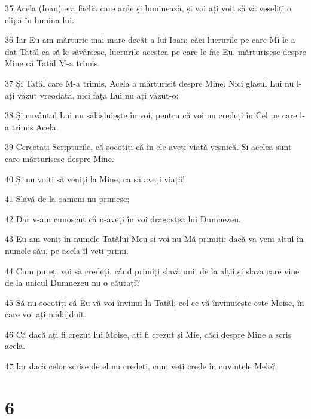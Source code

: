 \par 35 Acela (Ioan) era făclia care arde și luminează, și voi ați voit să vă veseliți o clipă în lumina lui.
\par 36 Iar Eu am mărturie mai mare decât a lui Ioan; căci lucrurile pe care Mi le-a dat Tatăl ca să le săvârșesc, lucrurile acestea pe care le fac Eu, mărturisesc despre Mine că Tatăl M-a trimis.
\par 37 Și Tatăl care M-a trimis, Acela a mărturisit despre Mine. Nici glasul Lui nu l-ați văzut vreodată, nici fața Lui nu ați văzut-o;
\par 38 Și cuvântul Lui nu sălășluiește în voi, pentru că voi nu credeți în Cel pe care l-a trimis Acela.
\par 39 Cercetați Scripturile, că socotiți că în ele aveți viață veșnică. Și acelea sunt care mărturisesc despre Mine.
\par 40 Și nu voiți să veniți la Mine, ca să aveți viață!
\par 41 Slavă de la oameni nu primesc;
\par 42 Dar v-am cunoscut că n-aveți în voi dragostea lui Dumnezeu.
\par 43 Eu am venit în numele Tatălui Meu și voi nu Mă primiți; dacă va veni altul în numele său, pe acela îl veți primi.
\par 44 Cum puteți voi să credeți, când primiți slavă unii de la alții și slava care vine de la unicul Dumnezeu nu o căutați?
\par 45 Să nu socotiți că Eu vă voi învinui la Tatăl; cel ce vă învinuiește este Moise, în care voi ați nădăjduit.
\par 46 Că dacă ați fi crezut lui Moise, ați fi crezut și Mie, căci despre Mine a scris acela.
\par 47 Iar dacă celor scrise de el nu credeți, cum veți crede în cuvintele Mele?

\chapter{6}

